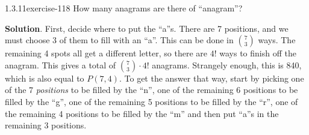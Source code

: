 \documentclass[twoside,11pt,]{book}
\numberwithin{equation}{chapter}
\begin{document}
\begin{divisionsolution}{1.3.11}{}{exercise-118}%
\hypertarget{p-1942}{}%
How many anagrams are there of ``anagram''?%
\par\smallskip%
\noindent\textbf{Solution}.\quad%
\hypertarget{p-1944}{}%
First, decide where to put the ``a''s. There are 7 positions, and we must choose 3 of them to fill with an ``a''. This can be done in \({7 \choose 3}\) ways. The remaining 4 spots all get a different letter, so there are \(4!\) ways to finish off the anagram. This gives a total of \({7 \choose 3}\cdot 4!\) anagrams. Strangely enough, this is 840, which is also equal to \(P(7,4)\text{.}\) To get the answer that way, start by picking one of the 7 \emph{positions} to be filled by the ``n'', one of the remaining 6 positions to be filled by the ``g'', one of the remaining 5 positions to be filled by the ``r'', one of the remaining 4 positions to be filled by the ``m'' and then put ``a''s in the remaining 3 positions.%
\end{divisionsolution}%
\end{document}

